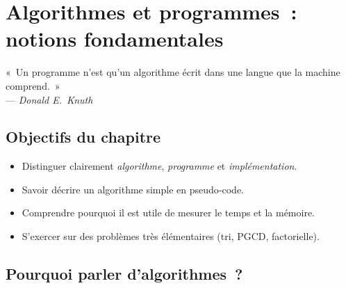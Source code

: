 
\chapter{Algorithmes et programmes : notions fondamentales}

\begin{flushright}\small
« Un programme n’est qu’un algorithme écrit dans une langue que la machine
comprend. »\\[-0.2em]
— \textit{Donald E. Knuth}
\end{flushright}

\section*{Objectifs du chapitre}
\begin{itemize}[label=\small$\blacktriangleright$]
  \item Distinguer clairement \emph{algorithme}, \emph{programme} et \emph{implémentation}.
  \item Savoir décrire un algorithme simple en pseudo‑code.
  \item Comprendre pourquoi il est utile de mesurer le temps et la mémoire.
  \item S’exercer sur des problèmes très élémentaires (tri, PGCD, factorielle).
\end{itemize}
\vspace{0.5em}

\section{Pourquoi parler d’algorithmes ?}

